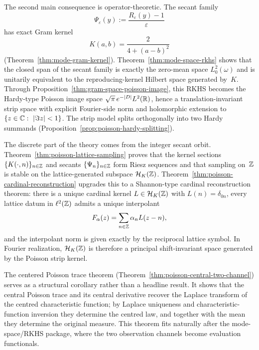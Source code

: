 The second main consequence is operator-theoretic.  The secant family
\[
\Psi_\varepsilon(y):=\frac{R_\varepsilon(y)-1}{\varepsilon}
\]
has exact Gram kernel
\[
K(a,b)=\frac{2}{4+(a-b)^2}
\]
(Theorem~\ref{thm:mode-gram-kernel}).  Theorem~\ref{thm:mode-space-rkhs}
shows that the closed span of the secant family is exactly the zero-mean
space $L^2_0(\omega)$ and is unitarily equivalent to the
reproducing-kernel Hilbert space generated by~$K$.  Through
Proposition~\ref{thm:gram-space-poisson-image}, this RKHS becomes the
Hardy-type Poisson image space $\sqrt{\pi}\,e^{-|D|}L^2(\mathbb{R})$, hence a
translation-invariant strip space with explicit Fourier-side norm and
holomorphic extension to $\{z\in\mathbb{C}:\ |\Im z|<1\}$.  The strip model
splits orthogonally into two Hardy summands
(Proposition~\ref{prop:poisson-hardy-splitting}).

The discrete part of the theory comes from the integer secant orbit.
Theorem~\ref{thm:poisson-lattice-sampling} proves that the kernel
sections $\{K(\cdot,n)\}_{n\in\mathbb{Z}}$ and secants $\{\Psi_n\}_{n\in\mathbb{Z}}$
form Riesz sequences and that sampling on~$\mathbb{Z}$ is stable on the
lattice-generated subspace $\mathcal H_K(\mathbb{Z})$.  Theorem~\ref{thm:poisson-cardinal-reconstruction}
upgrades this to a Shannon-type cardinal reconstruction theorem: there
is a unique cardinal kernel $L\in\mathcal H_K(\mathbb{Z})$ with
$L(n)=\delta_{0n}$, every lattice datum in $\ell^2(\mathbb{Z})$ admits a
unique interpolant
\[
F_\alpha(z)=\sum_{n\in\mathbb{Z}}\alpha_nL(z-n),
\]
and the interpolant norm is given exactly by the reciprocal lattice
symbol.  In Fourier realization, $\mathcal H_K(\mathbb{Z})$ is therefore a
principal shift-invariant space generated by the Poisson strip kernel.

The centered Poisson trace theorem
(Theorem~\ref{thm:poisson-central-two-channel}) serves as a structural
corollary rather than a headline result.  It shows that
the central Poisson trace and its central derivative recover the
Laplace transform of the centred characteristic function; by Laplace
uniqueness and characteristic-function inversion they determine the
centred law, and together with the mean they determine the original
measure.  This theorem fits naturally after the mode-space/RKHS package,
where the two observation channels become evaluation functionals.


